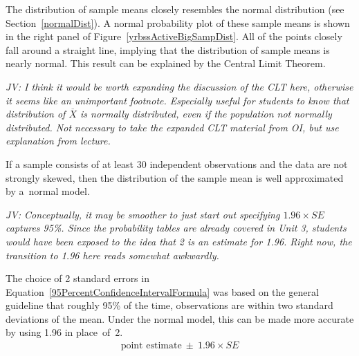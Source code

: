 \begin{spacing}{1.5}

The distribution of sample means closely resembles the normal distribution (see Section~\ref{normalDist}). A normal probability plot of these sample means is shown in the right panel of Figure~\ref{yrbssActiveBigSampDist}. All of the points closely fall around a straight line, implying that the distribution of sample means is nearly normal. This result can be explained by the Central Limit Theorem.

\textit{JV: I think it would be worth expanding the discussion of the CLT here, otherwise it seems like an unimportant footnote. Especially useful for students to know that distribution of $\overline{X}$ is normally distributed, even if the population not normally distributed. Not necessary to take the expanded CLT material from OI, but use explanation from lecture.}

\begin{termBox}{
If a sample consists of at least 30 independent observations and the data are not strongly skewed, then the distribution of the sample mean is well approximated by a~normal model.}
\end{termBox}


\textit{JV: Conceptually, it may be smoother to just start out specifying $1.96 \times SE$ captures 95\%. Since the probability tables are already covered in Unit 3, students would have been exposed to the idea that 2 is an estimate for 1.96. Right now, the transition to 1.96 here reads somewhat awkwardly.}

The choice of 2 standard errors in Equation~\ref{95PercentConfidenceIntervalFormula} was based on the general guideline that roughly 95\% of the time, observations are within two standard deviations of the mean. Under the normal model, this can be made more accurate by using 1.96 in place~of~2.
\begin{align}
\text{point estimate}\ \pm\ 1.96\times SE
\label{95PercentCIWhenUsingNormalModel}
\end{align}



\end{spacing}
